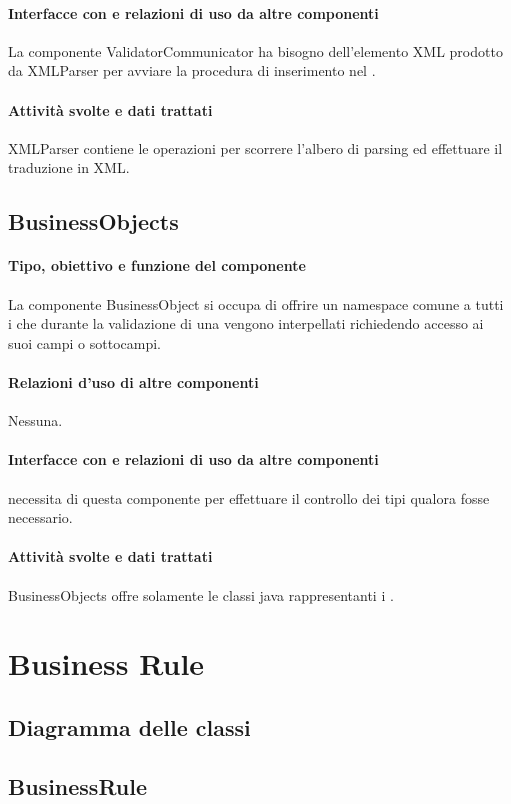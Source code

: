 \documentclass[11pt,titlepage,a4paper]{report}
\begin{document}
\paragraph{Interfacce con e relazioni di uso da altre componenti}
La componente ValidatorCommunicator ha bisogno dell'elemento XML prodotto da XMLParser per avviare la procedura di inserimento nel \re.
\paragraph{Attivit\`a svolte e dati trattati}
XMLParser contiene le operazioni per scorrere l'albero di parsing ed effettuare il traduzione in XML.

\subsection{BusinessObjects}%
\paragraph{Tipo, obiettivo e funzione del componente}
La componente BusinessObject si occupa di offrire un namespace comune a tutti i \bos che durante la validazione di una \br vengono interpellati richiedendo accesso ai suoi campi o sottocampi.
\paragraph{Relazioni d'uso di altre componenti}
Nessuna.
\paragraph{Interfacce con e relazioni di uso da altre componenti}
\brp necessita di questa componente per effettuare il controllo dei tipi qualora fosse necessario.
\paragraph{Attivit\`a svolte e dati trattati}
BusinessObjects offre solamente le classi java rappresentanti i \bos.

\section{Business Rule}
\subsection{Diagramma delle classi}
\subsection{BusinessRule}
\end{document}

